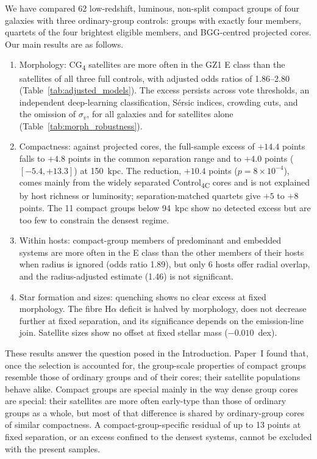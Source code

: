 \documentclass{aa}
\newcommand{\CC}{Control\textsubscript{4C}}
\newcommand{\CG}{CG\textsubscript{4}}
\begin{document}
We have compared 62 low-redshift, luminous, non-split compact groups of four galaxies with three ordinary-group controls: groups with exactly four members, quartets of the four brightest eligible members, and BGG-centred projected cores. Our main results are as follows.
\begin{enumerate}
\item Morphology: \CG{} satellites are more often in the GZ1 E class than the satellites of all three full controls, with adjusted odds ratios of 1.86--2.80 (Table~\ref{tab:adjusted_models}). The excess persists across vote thresholds, an independent deep-learning classification, S\'ersic indices, crowding cuts, and the omission of \(\sigma_v\), for all galaxies and for satellites alone (Table~\ref{tab:morph_robustness}).
\item Compactness: against projected cores, the full-sample excess of \(+14.4\) points falls to \(+4.8\) points in the common separation range and to \(+4.0\) points (\([-5.4, +13.3]\)) at 150~kpc. The reduction, \(+10.4\) points (\(p = 8\times 10^{-4}\)), comes mainly from the widely separated \CC{} cores and is not explained by host richness or luminosity; separation-matched quartets give \(+5\) to \(+8\) points. The 11 compact groups below 94~kpc show no detected excess but are too few to constrain the densest regime.
\item Within hosts: compact-group members of predominant and embedded systems are more often in the E class than the other members of their hosts when radius is ignored (odds ratio 1.89), but only 6 hosts offer radial overlap, and the radius-adjusted estimate (1.46) is not significant.
\item Star formation and sizes: quenching shows no clear excess at fixed morphology. The fibre H\(\alpha\) deficit is halved by morphology, does not decrease further at fixed separation, and its significance depends on the emission-line join. Satellite sizes show no offset at fixed stellar mass (\(-0.010\)~dex).
\end{enumerate}
These results answer the question posed in the Introduction. Paper~I found that, once the selection is accounted for, the group-scale properties of compact groups resemble those of ordinary groups and of their cores; their satellite populations behave alike. Compact groups are special mainly in the way dense group cores are special: their satellites are more often early-type than those of ordinary groups as a whole, but most of that difference is shared by ordinary-group cores of similar compactness. A compact-group-specific residual of up to 13 points at fixed separation, or an excess confined to the densest systems, cannot be excluded with the present samples.
\end{document}
